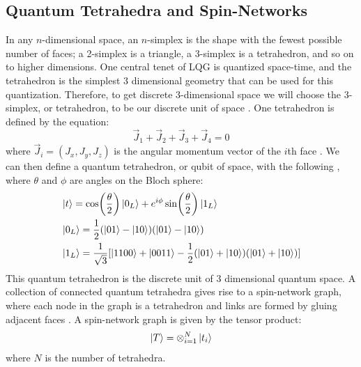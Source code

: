 \documentclass[a4paper,11pt,aps,tightenlines,nofootinbib]{revtex4}
\begin{document}
\subsection{Quantum Tetrahedra and Spin-Networks}
        In any $n$-dimensional space, an $n$-simplex is the shape with the fewest possible number of faces; a 
        2-simplex is a triangle, a 3-simplex is a tetrahedron, and so on to higher dimensions. One central tenet 
        of LQG is quantized space-time, and the tetrahedron is the simplest 3 dimensional geometry that can be used for this quantization. 
        Therefore, to get discrete 3-dimensional space 
        we will choose the 3-simplex, or tetrahedron, to be our discrete unit of space \cite{simplical-decomp}. One tetrahedron is defined by the 
        equation: 
        \begin{equation} 
                \vec J_1 + \vec J_2 + \vec J_3 + \vec J_4 = 0
        \end{equation}
        where $\vec J_i = (J_x,J_y,J_z)$ is the angular momentum vector of the $i$th face \cite{covariant-lqg}. We can then define 
        a quantum tetrahedron, or qubit of space, with the following \cite{qspacetime-on-qsim}, where $\theta$ and $\phi$ are 
        angles on the Bloch sphere: 
        \begin{align}
                &\ket{t} = \cos(\frac{\theta}{2})\ket{0_L} + e^{i\phi}\sin(\frac{\theta}{2}) \ket{1_L}\\
                &\ket{0_L} = \frac{1}{2}(\ket{01}-\ket{10})(\ket{01}-\ket{10})\\
                &\ket{1_L} = \frac{1}{\sqrt{3}}[\ket{1100}+\ket{0011}-\frac{1}{2}(\ket{01}+\ket{10})(\ket{01}+\ket{10})]
        \end{align}
        This quantum tetrahedron is the discrete unit of 3 dimensional quantum space.
        A collection of connected quantum tetrahedra gives rise to a spin-network graph, where each node in the graph is a tetrahedron and links are formed by gluing adjacent faces \cite{gluing-polyhedra}. 
        A spin-network graph is given by the tensor product: 
        \begin{equation}
                \ket{T} = \otimes_{i=1}^N\ket{t_i}
        \end{equation}
        where $N$ is the number of tetrahedra.
\end{document}
